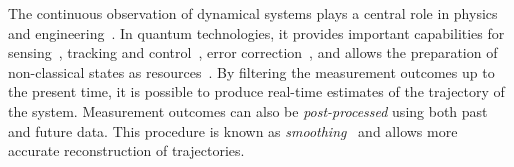 \documentclass[aps,prx,twocolumn,amsmath,amssymb,superscriptaddress,floatfix,longbibliography
]{revtex4-2}
\begin{document}
The continuous observation of dynamical systems plays a central role in physics and engineering~\cite{stengel1994optimal,wiseman2009quantum,Dong2022quantum,Carmichael1993open}.
In quantum technologies, it provides important capabilities for sensing~\cite{jimenez2018signal,Duan2025concurrent}, tracking and control~\cite{Sayrin2011realtime,wieczorek2015optimal,thomas2021entanglement,Magrini2021realtime}, error correction~\cite{convy2022machine,livingston2022experimental}, and allows the preparation of non-classical states as resources~\cite{muller2008entanglement,meng2020mechanical,thomas2021entanglement}.
By filtering
the measurement outcomes up to the present time, it is possible to produce real-time estimates of the trajectory
of the system.  
%
%
Measurement outcomes can also be
\textit{post-processed} using both past and future data. 
This procedure is known as \textit{smoothing}~\cite{Weinert01} and allows more accurate reconstruction of trajectories.

%
\end{document}
